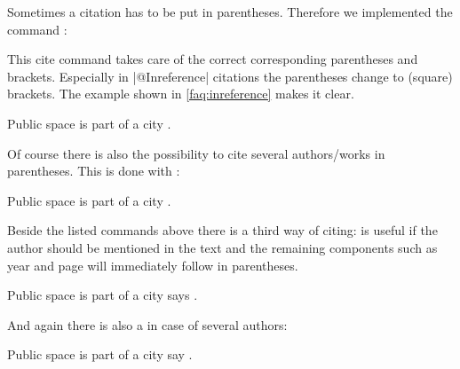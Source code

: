 \documentclass[a4paper,
10pt,
greek,
french,
spanish,
italian,
ngerman,
english
]{ltxdoc}
\begin{document}
 
\DescribeMacro{\parencite}
Sometimes a citation has to be put in parentheses. 
Therefore we implemented the command :
This cite command takes care of the correct corresponding parentheses and brackets.
Especially in |@Inreference| citations the parentheses  change to (square) brackets.
The example shown in \cref{faq:inreference} makes it clear.
\begin{example}
Public space is part of a city \parencite{Osland2016}.
\end{example}

\DescribeMacro{\parencites}
Of course there is also the possibility to cite several authors/works in parentheses.
This is done with :
\begin{example}
Public space is part of a city \parencites(cf.)(){Osland2016}{Evangelidis2014}.
\end{example}

\DescribeMacro{\textcite}
Beside the listed  commands above there is a third way of citing:
 is useful if the author should be mentioned in the text and
the remaining components such as year and page will immediately follow in parentheses. 

\begin{example}
Public space is part of a city says \textcite{Osland2016}.
\end{example}

\DescribeMacro{\textcites}
And again there is also a  in case of several authors: 
\begin{example}
Public space is part of a city say \textcites{Osland2016}[cf.][]{Evangelidis2014}.
\end{example}
\end{document}
